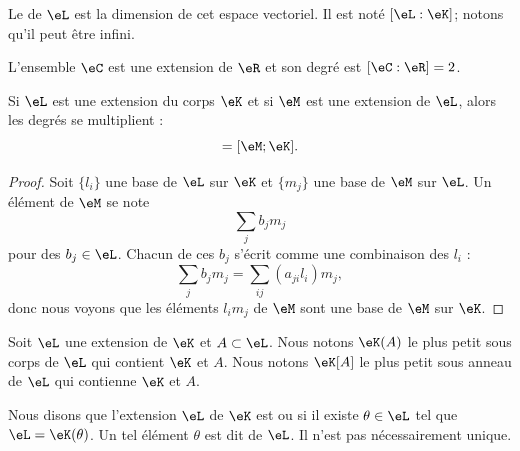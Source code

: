 \begin{definition}      \label{DefUYiyieu}
    Le  de \( \eL\) est la dimension de cet espace vectoriel. Il est noté \( [\eL:\eK]\); notons qu'il peut être infini.
\end{definition}

\begin{example}
    L'ensemble \( \eC\) est une extension de \( \eR\) et son degré est \( [\eC:\eR]=2\).
\end{example}

\begin{proposition}     \label{PropGWazMpY}
    Si \( \eL\) est une extension du corps \( \eK\) et si \( \eM\) est une extension de \( \eL\), alors les degrés se multiplient :
    \begin{equation}
        [\eM:\eL][\eL:\eK]=[\eM;\eK].
    \end{equation}
\end{proposition}

\begin{proof}
    Soit \( \{ l_i \}\) une base de \( \eL\) sur \( \eK\) et \( \{ m_j \}\) une base de \( \eM\) sur \( \eL\). Un élément de \( \eM\) se note
    \begin{equation}
        \sum_{j}b_jm_j
    \end{equation}
    pour des \( b_j\in \eL\). Chacun de ces \( b_j\) s'écrit comme une combinaison des \( l_i\) :
    \begin{equation}
        \sum_{j}b_jm_j=\sum_{ij}(a_{ji}l_i)m_j,
    \end{equation}
    donc nous voyons que les éléments \( l_im_j\) de \( \eM\) sont une base de \( \eM\) sur \( \eK\).
\end{proof}

\begin{definition}  \label{DefZCYIbve}
    Soit \( \eL\) une extension de \( \eK\) et \( A\subset \eL\). Nous notons \( \eK(A)\) le plus petit sous corps de \( \eL\) qui contient \( \eK\) et \( A\). Nous notons \( \eK[A]\) le plus petit sous anneau de \( \eL\) qui contienne \( \eK\) et \( A\).

    Nous disons que l'extension \( \eL\) de \( \eK\) est  ou  si il existe \( \theta\in\eL\) tel que \( \eL=\eK(\theta)\). Un tel élément \( \theta\) est dit  de \( \eL\). Il n'est pas nécessairement unique.
\end{definition}

